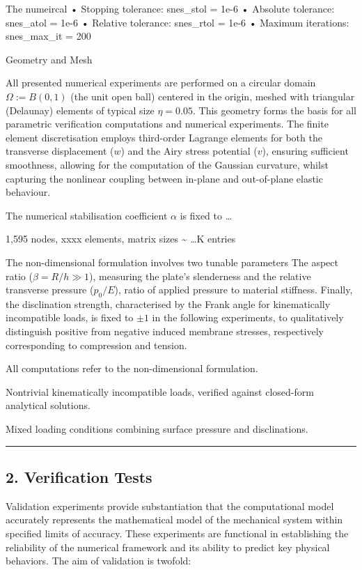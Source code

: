 \documentclass[
  11pt,
]{article}
\begin{document}
The numeircal • Stopping tolerance: snes\_stol = 1e-6 • Absolute
tolerance: snes\_atol = 1e-6 • Relative tolerance: snes\_rtol = 1e-6 •
Maximum iterations: snes\_max\_it = 200

Geometry and Mesh

All presented numerical experiments are performed on a circular domain
\(\Omega := B(0, 1)\) (the unit open ball) centered in the origin,
meshed with triangular (Delaunay) elements of typical size
\(\eta = 0.05\). This geometry forms the basis for all parametric
verification computations and numerical experiments. The finite element
discretisation employs third-order Lagrange elements for both the
transverse displacement (\(w\)) and the Airy stress potential (\(v\)),
ensuring sufficient smoothness, allowing for the computation of the
Gaussian curvature, whilst capturing the nonlinear coupling between
in-plane and out-of-plane elastic behaviour.

The numerical stabilisation coefficient \(\alpha\) is fixed to \ldots{}

1,595 nodes, xxxx elements, matrix sizes \textasciitilde{} \ldots K
entries

The non-dimensional formulation involves two tunable parameters The
aspect ratio (\(\beta = R/h \gg 1\)), measuring the plate's slenderness
and the relative transverse pressure (\(p_0/E\)), ratio of applied
pressure to material stiffness. Finally, the disclination strength,
characterised by the Frank angle for kinematically incompatible loads,
is fixed to \(\pm 1\) in the following experiments, to qualitatively
distinguish positive from negative induced membrane stresses,
respectively corresponding to compression and tension.

All computations refer to the non-dimensional formulation.

Nontrivial kinematically incompatible loads, verified against
closed-form analytical solutions.

Mixed loading conditions combining surface pressure and disclinations.

\begin{center}\rule{0.5\linewidth}{0.5pt}\end{center}

\subsection{2. Verification Tests}\label{verification-tests}

Validation experiments provide substantiation that the computational
model accurately represents the mathematical model of the mechanical
system within specified limits of accuracy. These experiments are
functional in establishing the reliability of the numerical framework
and its ability to predict key physical behaviors. The aim of validation
is twofold:
\end{document}
